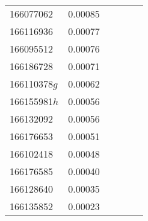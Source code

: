 \begin{landscape}
\begin{longtable}{p{1.8cm}p{0.9cm}p{2.2cm}p{1cm}p{2.8cm}p{13.4cm}}
166077062&0.00085&&&& \\
166116936&0.00077&&&& \\
166095512&0.00076&&&& \\
166186728&0.00071&&&& \\
166110378$g$&0.00062&&&& \\
166155981$h$&0.00056&&&& \\
166132092&0.00056&&&& \\
166176653&0.00051&&&& \\
166102418&0.00048&&&& \\
166176585&0.00040&&&& \\
166128640&0.00035&&&& \\
166135852&0.00023&&&& \\
\end{longtable}
\endgroup
\end{landscape}
